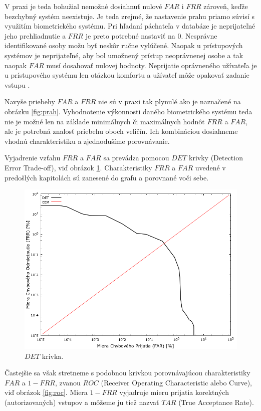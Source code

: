 V praxi je teda bohužial nemožné dosiahnuť nulové $FAR$ i $FRR$ zároveň, keďže bezchybný systém neexistuje. Je teda zrejmé, že nastavenie prahu priamo súvisí s využitím biometrického systému. Pri hľadaní páchateľa v databáze je neprijateľné jeho prehliadnutie a $FRR$ je preto potrebné nastaviť na 0. Nesprávne identifikované osoby možu byť neskôr ručne vylúčené. Naopak u prístupových systémov je neprijateľné, aby bol umožnený prístup neoprávnenej osobe a tak naopak $FAR$ musí dosahovať nulovej hodnoty. Neprijatie oprávneného užívateľa je u prístupového systému len otázkou komfortu a užívateľ môže opakovať zadanie vstupu \cite{bio3}.

Navyše priebehy $FAR$ a $FRR$ nie sú v praxi tak plynulé ako je naznačené na obrázku \ref{fig:prah}. Vyhodnotenie výkonnosti daného biometrického systému teda nie je možné len na základe minimálnych či maximálnych hodnôt $FRR$ a $FAR$, ale je potrebná znalosť priebehu oboch veličín. Ich kombináciou dosiahneme vhodnú charakteristiku a zjednodušíme porovnávanie.

Vyjadrenie vzťahu $FRR$ a $FAR$ sa prevádza pomocou $DET$ krivky (Detection Error Trade-off), viď obrázok \ref{fig:det}. Charakteristiky $FRR$ a $FAR$ uvedené v predošlých kapitolách sú zanesené do grafu a porovnané voči sebe.

\begin{figure}[h]
	\centering
	\includegraphics[width=13cm]{img/det.png}
	\caption{$DET$ krivka\cite{bio}.}
	\label{fig:det}
\end{figure}

Častejšie sa však stretneme s podobnou krivkou porovnávajúcou charakteristiky $FAR$ a $1 - FRR$, zvanou $ROC$ (Receiver Operating Characteristic alebo Curve), viď obrázok \ref{fig:roc}. Miera $1 - FRR$ vyjadruje mieru prijatia korektných (autorizovaných) vstupov a môžeme ju tiež nazvať $TAR$ (True Acceptance Rate).

